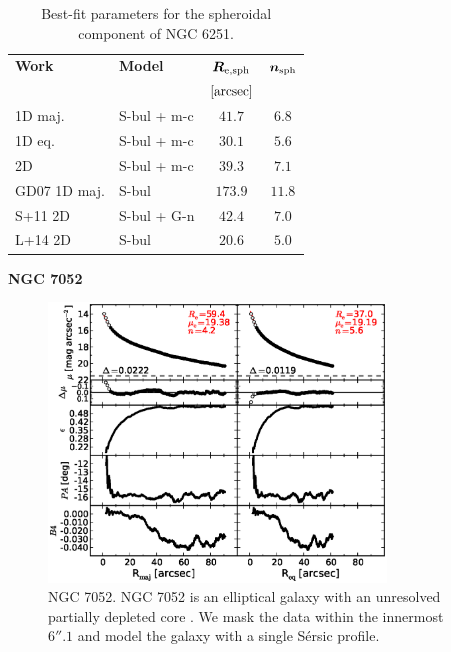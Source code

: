 \documentclass[preprint2]{emulateapj}
\newcommand{\fitfigurewidth}{0.8\textwidth}
\begin{document}
  \begin{table}[h]
  \small
  \caption{Best-fit parameters for the spheroidal component of NGC 6251.}
  \begin{center}
  \begin{tabular}{llcc}
  \hline
  {\bf Work} & {\bf Model}   & $\bm R_{\rm e,sph}$    & $\bm n_{\rm sph}$ \\
    &  &  $[\rm arcsec]$ & \\
  \hline
  1D maj. & S-bul + m-c & $41.7$  &  $6.8$ \\
  1D eq.  & S-bul + m-c & $30.1$  &  $5.6$ \\
  2D      & S-bul + m-c & $39.3$  &  $7.1$ \\
  \hline
  GD07 1D maj.      & S-bul	     & $173.9$  &  $11.8$ \\
  S+11 2D      & S-bul + G-n    & $42.4$	&  $7.0$ \\
  L+14 2D      & S-bul	     & $20.6$	&  $5.0$ \\
  \hline
  \end{tabular}
  \end{center}
  \label{tab:n6251}
  \end{table}


  \clearpage\newpage\noindent
  {\bf NGC 7052 \\}

  \begin{figure}[h]
  \begin{center}
  \includegraphics[width=\fitfigurewidth]{images/n7052_1Dfit.eps}
  \caption{NGC 7052.
  NGC 7052 is an elliptical galaxy with an unresolved partially depleted core \citep{quillen2000}. %
  We mask the data within the innermost $6''.1$ and model the galaxy with a single S\'ersic profile.
  }
  \end{center}
  \end{figure}
\end{document}

